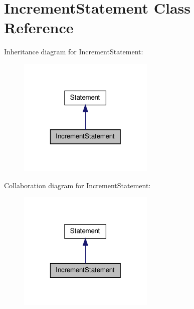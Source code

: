 \hypertarget{class_increment_statement}{\section{Increment\-Statement Class Reference}
\label{class_increment_statement}
}


Inheritance diagram for Increment\-Statement\-:
\nopagebreak
\begin{figure}[H]
\begin{center}
\leavevmode
\includegraphics[width=184pt]{class_increment_statement__inherit__graph}
\end{center}
\end{figure}


Collaboration diagram for Increment\-Statement\-:
\nopagebreak
\begin{figure}[H]
\begin{center}
\leavevmode
\includegraphics[width=184pt]{class_increment_statement__coll__graph}
\end{center}
\end{figure}
